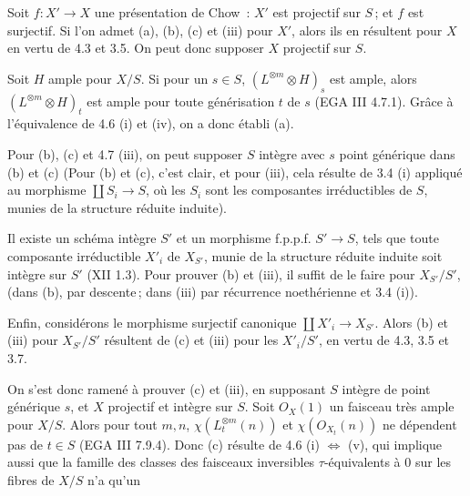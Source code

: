 
Soit \(f:X'\to X\) une pr\'esentation de Chow~: \(X'\) est projectif sur \(S\)\,; et \(f\) est surjectif. Si l'on admet (a), (b), (c) et (iii) pour \(X'\), alors ils en r\'esultent pour \(X\) en vertu de 4.3 et 3.5. On peut donc supposer \(X\) projectif sur \(S\).

Soit \(H\) ample pour \(X/S\). Si pour un \(s\in S\), \((L^{\otimes m}\otimes H)_s\) est ample, alors \((L^{\otimes m}\otimes H)_t\) est ample pour toute g\'en\'erisation \(t\) de \(s\) (EGA III 4.7.1). Gr\^ace \`a l'\'equivalence de 4.6 (i) et (iv), on a donc \'etabli (a).

Pour (b), (c) et 4.7 (iii), on peut supposer \(S\) int\`egre avec \(s\) point g\'en\'erique dans (b) et (c) (Pour (b) et (c), c'est clair, et pour (iii), cela r\'esulte de 3.4 (i) appliqu\'e au morphisme \(\coprod S_i\to S\), o\`u les \(S_i\) sont les composantes irr\'eductibles de \(S\), munies de la structure r\'eduite induite).

Il existe un sch\'ema int\`egre \(S'\) et un morphisme f.p.p.f. \(S'\to S\), tels que toute composante irr\'eductible \(X'_i\) de \(X_{S'}\), munie de la structure r\'eduite induite soit int\`egre sur \(S'\) (XII 1.3). Pour prouver (b) et (iii), il suffit de le faire pour \(X_{S'}/S'\), (dans (b), par descente\,; dans (iii) par r\'ecurrence noeth\'erienne et 3.4 (i)).

Enfin, consid\'erons le morphisme surjectif canonique \(\coprod X'_i\to X_{S'}\). Alors (b) et (iii) pour \(X_{S'}/S'\) r\'esultent de (c) et (iii) pour les \(X'_i/S'\), en vertu de 4.3, 3.5 et 3.7.

On s'est donc ramen\'e \`a prouver (c) et (iii), en supposant \(S\) int\`egre de point g\'en\'erique \(s\), et \(X\) projectif et int\`egre sur \(S\). Soit \({O}_X(1)\) un faisceau tr\`es ample pour \(X/S\). Alors pour tout \(m,n\), \(\chi(L_t^{\otimes m}(n))\) et \(\chi({O}_{X_t}(n))\) ne d\'ependent pas de \(t\in S\) (EGA III 7.9.4). Donc (c) r\'esulte de 4.6 (i) \(\Longleftrightarrow\) (v), qui implique aussi que la famille des classes des faisceaux inversibles \(\tau\)-\'equivalents \`a \(0\) sur les fibres de \(X/S\) n'a qu'un
